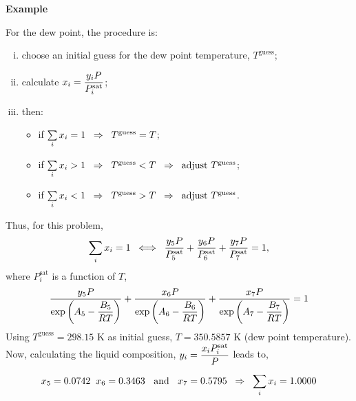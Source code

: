 \begin{MyExample}{\begin{center}{\bf Example}\end{center}}
\medskip
    For the dew point, the procedure is:
    \begin{enumerate}[i)]
       \item choose an initial guess for the dew point temperature, $T^{\text{guess}}$;
       \item calculate $x_{i}=\frc{y_{i}P}{P_{i}^{\text{sat}}}$;
       \item then:
           \begin{itemize}
              \item if $\summation[x_{i}]{i}{} = 1 \;\;\Rightarrow \;\; T^{\text{guess}} = T$;
              \item if $\summation[x_{i}]{i}{} > 1 \;\;\Rightarrow \;\; T^{\text{guess}} < T \;\; \Rightarrow\;\; \text{adjust } T^{\text{guess}}$;
              \item if $\summation[x_{i}]{i}{} < 1 \;\;\Rightarrow \;\; T^{\text{guess}} > T \;\; \Rightarrow\;\; \text{adjust } T^{\text{guess}}$.
           \end{itemize}
    \end{enumerate}
    Thus, for this problem,
    \begin{displaymath}
        \summation[x_{i}]{i}{} = 1\;\; \Longleftrightarrow \;\; \frc{y_{5}P}{P_{5}^{\text{sat}}} + \frc{y_{6}P}{P_{6}^{\text{sat}}} + \frc{y_{7}P}{P_{7}^{\text{sat}}} = 1,
    \end{displaymath}
    where $P_{i}^{\text{sat}}$ is a function of $T$, 
    \begin{displaymath}
        \frc{y_{5}P}{\exp{\left(A_{5}-\frc{B_{5}}{RT}\right)}} + \frc{x_{6}P}{\exp{\left(A_{6}-\frc{B_{6}}{RT}\right)}} + \frc{x_{7}P}{\exp{\left(A_{7}-\frc{B_{7}}{RT}\right)}}= 1
    \end{displaymath}
    Using $T^{\text{guess}}=298.15$ K as initial guess, $T=350.5857$ K (dew point temperature). Now, calculating the liquid composition, $y_{i}=\frc{x_{i}P_{i}^{\text{sat}}}{P}$ leads to,
    \begin{displaymath}
        x_{5} =0.0742\;\; x_{6} = 0.3463\;\;\text{ and }\;\;x_{7} = 0.5795\;\;\Rightarrow\;\; \summation[x_{i}]{i}{} = 1.0000
    \end{displaymath}
   \end{MyExample}

